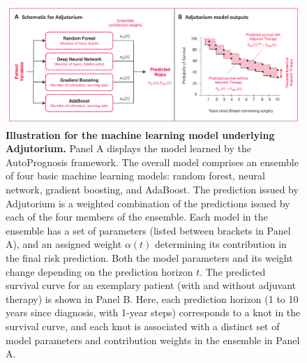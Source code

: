 \documentclass [PhD] {uclathes}
\begin{document}
\afterpage{\clearpage}
\begin{figure}
\centering
   \includegraphics[width=9in]{ch8Fig3.pdf}
    \caption{{\bf Illustration for the machine learning model underlying Adjutorium.} Panel A displays the model learned by the AutoPrognosis framework. The overall model comprises an ensemble of four basic machine learning models: random forest, neural network, gradient boosting, and AdaBoost. The prediction issued by Adjutorium is a weighted combination of the predictions issued by each of the four members of the ensemble. Each model in the ensemble has a set of parameters (listed between brackets in Panel A), and an assigned weight $\alpha(t)$ determining its contribution in the final risk prediction. Both the model parameters and its weight change depending on the prediction horizon $t$. The predicted survival curve for an exemplary patient (with and without adjuvant therapy) is shown in Panel B. Here, each prediction horizon (1 to 10 years since diagnosis, with 1-year steps) corresponds to a knot in the survival curve, and each knot is associated with a distinct set of model parameters and contribution weights in the ensemble in Panel A.}
    \label{ch8fig3}
\end{figure} 
\end{document}
